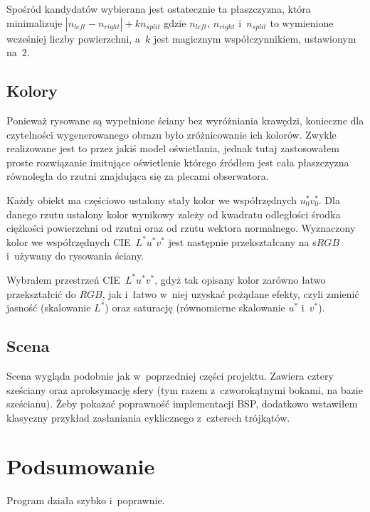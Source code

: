 \documentclass[12pt,a4paper]{article}
\begin{document}
Spośród kandydatów wybierana jest ostatecznie ta płaszczyzna,
która minimalizuje
$ \left| n_{left} - n_{right} \right| + k n_{split} $
gdzie $n_{left}$, $n_{right}$ i~$n_{split}$ to wymienione wcześniej
liczby powierzchni,
a~$k$ jest magicznym współczynnikiem, ustawionym na~$2$. %

\subsection{Kolory}
Ponieważ rysowane są wypełnione ściany bez wyróżniania krawędzi,
konieczne dla czytelności wygenerowanego obrazu było zróżnicowanie
ich kolorów.
Zwykle realizowane jest to przez jakiś model oświetlania,
jednak tutaj zastosowałem proste rozwiązanie imitujące
oświetlenie którego źródłem jest cała płaszczyzna równoległa
do rzutni znajdująca się za plecami obserwatora.

Każdy obiekt ma częściowo ustalony stały kolor we współrzędnych $u^*_0v^*_0$.
Dla danego rzutu ustalony kolor wynikowy zależy od kwadratu odległości
środka ciężkości powierzchni od rzutni oraz od rzutu wektora normalnego.
Wyznaczony kolor we współrzędnych CIE~$L^*u^*v^*$ jest następnie
przekształcany na {s$RGB$} i~używany do rysowania ściany.

Wybrałem przestrzeń CIE~$L^*u^*v^*$, gdyż tak opisany kolor zarówno łatwo
przekształcić do $RGB$, jak i~łatwo w~niej uzyskać pożądane efekty, czyli
zmienić jasność (skalowanie $L^*$)
oraz saturację (równomierne skalowanie $u^*$ i~$v^*$).

\subsection{Scena}
Scena wygląda podobnie jak w~poprzedniej części projektu.
Zawiera cztery sześciany oraz aproksymację sfery
(tym razem z~czworokątnymi bokami, na bazie sześcianu).
Żeby pokazać poprawność implementacji BSP, 
dodatkowo wstawiłem klasyczny przykład zasłaniania cyklicznego
z~czterech trójkątów.

\section{Podsumowanie}
Program działa szybko i~poprawnie.
\end{document}
